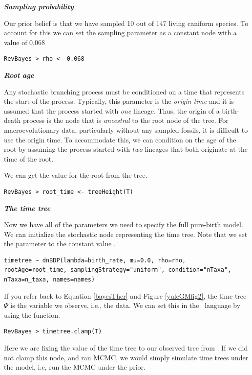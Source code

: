 \textbf{\textit{Sampling probability}}

Our prior belief is that we have sampled 10 out of 147 living caniform species. 
To account for this we can set the sampling parameter as a constant node with a value of 0.068
{\tt \begin{snugshade*}
\begin{lstlisting}
RevBayes > rho <- 0.068
\end{lstlisting}
\end{snugshade*}}


\textbf{\textit{Root age}}

Any stochastic branching process must be conditioned on a time that represents the start of the process. 
Typically, this parameter is the \textit{origin time} and it is assumed that the process started with \textit{one} lineage. 
Thus, the origin of a birth-death process is the node that is \textit{ancestral} to the root node of the tree.
For macroevolutionary data, particularly without any sampled fossils, it is difficult to use the origin time.
To accommodate this, we can condition on the age of the root by assuming the process started with \textit{two} lineages that both originate at the time of the root.

We can get the value for the root from the \citet{dosReis2012} tree.

{\tt \begin{snugshade*}
\begin{lstlisting}
RevBayes > root_time <- treeHeight(T)
\end{lstlisting}
\end{snugshade*}}

\textbf{\textit{The time tree}}

Now we have all of the parameters we need to specify the full pure-birth model. 
We can initialize the stochastic node representing the time tree.
Note that we set the  parameter to the constant value .
{\tt \begin{snugshade*}
\begin{lstlisting}
timetree ~ dnBDP(lambda=birth_rate, mu=0.0, rho=rho, rootAge=root_time, samplingStrategy="uniform", condition="nTaxa", nTaxa=n_taxa, names=names)\end{lstlisting}
\end{snugshade*}}

If you refer back to Equation \ref{bayesTher} and Figure \ref{yuleGMfig2}, the time tree $\Psi$ is the variable we observe, i.e., the data. 
We can set this in the \Rev~language by using the  function.
{\tt \begin{snugshade*}
\begin{lstlisting}
RevBayes > timetree.clamp(T)
\end{lstlisting}
\end{snugshade*}}
Here we are fixing the value of the time tree to our observed tree from \citet{dosReis2012}.
If we did not clamp this node, and ran MCMC, we would simply simulate time trees under the model, i.e, run the MCMC under the prior.


